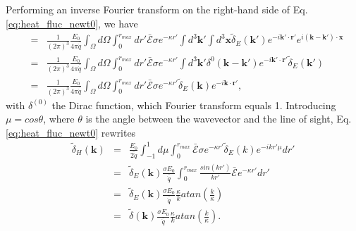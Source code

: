 \documentclass[twocolumns]{emulateapj}
\begin{document}
{%




Performing an inverse Fourier transform on the right-hand side of Eq.\ref{eq:heat_fluc_newt0}, we have
\begin{eqnarray}
  \label{eq:right}
  &=& \frac{1}{(2\pi)^3} \frac{E_0}{4\pi\bar{\dot{q}}}\int_{\Omega}d\Omega\int_0^{r_{max}} dr'\bar{ \mathcal{E}}\sigma  e^{-\kappa r'} \int d^3\mathbf{k'}\int d^3\mathbf{x} \tilde{\delta}_E(\mathbf{k'})e^{-i\mathbf{k'}\cdot{\mathbf{r}'}} e^{i(\mathbf{k}-\mathbf{k'})\cdot\mathbf{x}} \\ \nonumber
  &=&\frac{1}{(2\pi)^3} \frac{E_0}{4\pi\bar{\dot{q}}} \int_{\Omega}d\Omega\int_0^{r_{max}}   dr' \bar{\mathcal{E}}\sigma  e^{-\kappa r'} \int d^3\mathbf{k'} \delta^{0}(\mathbf{k}-\mathbf{k}')e^{-i\mathbf{k'}\cdot{\mathbf{r}'}} \tilde{\delta}_E(\mathbf{k'})    \\ \nonumber
  &=&\frac{1}{(2\pi)^3} \frac{E_0}{4\pi\bar{\dot{q}}} \int_{\Omega}d\Omega\int_0^{r_{max}}  dr' \bar{ \mathcal{E}}\sigma  e^{-\kappa r'}  \tilde{\delta}_E(\mathbf{k}) e^{-i\mathbf{k}\cdot{\mathbf{r}'}}  ,
\end{eqnarray}
with $\delta^{(0)}$ the Dirac function, which Fourier transform equals 1. Introducing $\mu=cos\theta$, where $\theta$ is the angle between the wavevector and the line of sight, Eq. \ref{eq:heat_fluc_newt0} rewrites
\begin{eqnarray}
  \label{eq:heat_fluc_newt1}
  \tilde{\delta}_H(\mathbf{k})&=&  \frac{E_0}{\bar{2\dot{q}}} \int_{-1}^{1} d\mu \int_0^{r_{max}}  \bar{\mathcal{E}}\sigma  e^{-\kappa r'}  \tilde{\delta}_E(k) e^{-ikr'\mu}  dr'\\ \nonumber
&=&\tilde{\delta}_E(\mathbf{k})\frac{\sigma E_0}{\bar{\dot{q}}}\int_0^{r_{max}} \frac{sin(kr')}{kr'}   \bar{\mathcal{E}}  e^{-\kappa r'}   dr'\\ \nonumber
&=&\tilde{\delta}_E(\mathbf{k})\frac{\sigma E_0}{ \bar{\dot{q}}}\frac{\kappa}{k}  atan\left(\frac{k}{\kappa}\right)\\ \nonumber
&=&\tilde{\delta}(\mathbf{k})\frac{\sigma E_0}{ \bar{\dot{q}}}\frac{\kappa}{k}  atan\left(\frac{k}{\kappa}\right).\\ 
\end{eqnarray}

}
\end{document}
